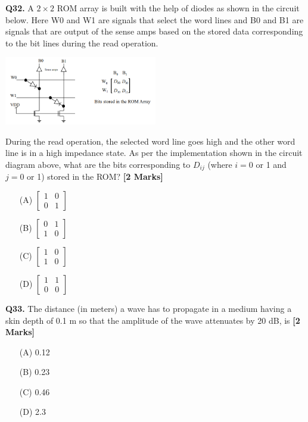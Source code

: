 \documentclass[11pt]{article}
\newcommand{\questionb}[2]{
    \noindent\textbf{Q#2.} #1 \hfill \textbf{[2 Marks]}
}
\begin{document}
\questionb{A $2 \times 2$ ROM array is built with the help of diodes as shown in the circuit below. Here W0 and W1 are signals that select the word lines and B0 and B1 are signals that are output of the sense amps based on the stored data corresponding to the bit lines during the read operation.

\begin{center}
\includegraphics[width=0.5\textwidth]{figures/32.png}
\end{center}

During the read operation, the selected word line goes high and the other word line is in a high impedance state. As per the implementation shown in the circuit diagram above, what are the bits corresponding to $D_{ij}$ (where $i = 0$ or 1 and $j = 0$ or 1) stored in the ROM?}{32}
\begin{enumerate}
    \item[(A)] $\begin{bmatrix} 1 & 0 \\ 0 & 1 \end{bmatrix}$
    \item[(B)] $\begin{bmatrix} 0 & 1 \\ 1 & 0 \end{bmatrix}$
    \item[(C)] $\begin{bmatrix} 1 & 0 \\ 1 & 0 \end{bmatrix}$
    \item[(D)] $\begin{bmatrix} 1 & 1 \\ 0 & 0 \end{bmatrix}$
\end{enumerate}

\vspace{0.5cm}

\questionb{The distance (in meters) a wave has to propagate in a medium having a skin depth of 0.1 m so that the amplitude of the wave attenuates by 20 dB, is}{33}
\begin{enumerate}
    \item[(A)] 0.12
    \item[(B)] 0.23
    \item[(C)] 0.46
    \item[(D)] 2.3
\end{enumerate}
\end{document}
